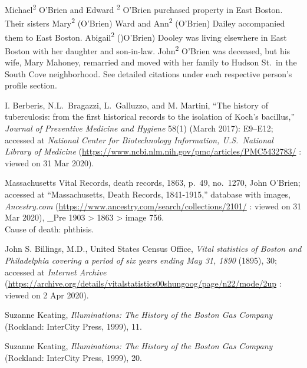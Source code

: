 \begin{thebibliography}{999}
Michael\textsuperscript{2} O'Brien and Edward \textsuperscript{2} O'Brien purchased property in East Boston. Their sisters Mary\textsuperscript{2} (O'Brien) Ward and Ann\textsuperscript{2} (O'Brien) Dailey accompanied them to East Boston. Abigail\textsuperscript{2} ()O'Brien) Dooley was living elsewhere in East Boston with her daughter and son-in-law. John\textsuperscript{2} O'Brien was deceased, but his wife, Mary Mahoney, remarried and moved with her family to Hudson St.\ in the South Cove neighborhood. See detailed citations under each respective person's profile section.

I. Berberis, N.L.\ Bragazzi, L.\ Galluzzo, and M. Martini, ``The history of tuberculosis: from the first historical records to the isolation of Koch's bacillus,'' \textit{Journal of Preventive Medicine and Hygiene} 58(1) (March 2017): E9--E12; accessed at \textit{National Center for Biotechnology Information, U.S.\ National Library of Medicine} (\url{https://www.ncbi.nlm.nih.gov/pmc/articles/PMC5432783/} : viewed on 31 Mar 2020).

Massachusetts Vital Records, death records, 1863, p.\ 49, no.\ 1270, John O'Brien; accessed at ``Massachusetts, Death Records, 1841-1915,'' database with images, \textit{Ancestry.com} (\url{https://www.ancestry.com/search/collections/2101/} : viewed on 31 Mar 2020), \_Pre 1903 > 1863 > image 756.\\
Cause of death: phthisis.

John S. Billings, M.D., United States Census Office, \textit{Vital statistics of Boston and Philadelphia covering a period of six years ending May 31, 1890} (1895), 30; accessed at \textit{Internet Archive} (\url{https://archive.org/details/vitalstatistics00shungoog/page/n22/mode/2up} : viewed on 2 Apr 2020). 

Suzanne Keating, \textit{Illuminations: The History of the Boston Gas Company} (Rockland: InterCity Press, 1999), 11.

Suzanne Keating, \textit{Illuminations: The History of the Boston Gas Company} (Rockland: InterCity Press, 1999), 20.

\end{thebibliography}
